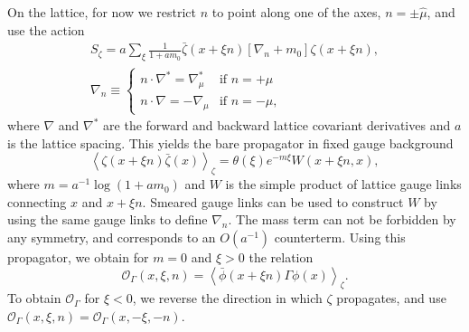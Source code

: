 \documentclass[prl,reprint,notitlepage,nofootinbib]{revtex4-1}
\newcommand{\cO}{\mathcal{O}}
\begin{document}
On the lattice, for now we restrict $n$ to point along one of the
axes, $n=\pm\hat\mu$, and use the action
\begin{equation}
\begin{gathered}
  S_\zeta = a\sum_\xi\frac{1}{1+am_0}\bar\zeta(x+\xi n)\left[\nabla_n+m_0\right]\zeta(x+\xi n),\\
\nabla_n\equiv\begin{cases}
n\cdot\nabla^* = \nabla^*_\mu & \text{if }n=+\hat\mu \\
n\cdot\nabla = -\nabla_\mu & \text{if }n=-\hat\mu,
\end{cases}
\end{gathered}
\end{equation}
where $\nabla$ and $\nabla^*$ are the forward and backward lattice
covariant derivatives and $a$ is the lattice spacing. This yields the
bare propagator in fixed gauge background
\begin{equation}
  \left\langle \zeta(x+\xi n)\bar\zeta(x)\right\rangle_\zeta = \theta(\xi)e^{-m\xi}W(x+\xi n,x),
\end{equation}
where $m=a^{-1}\log(1+am_0)$ and $W$ is the simple product of lattice
gauge links connecting $x$ and $x+\xi n$. Smeared gauge links can be
used to construct $W$ by using the same gauge links to define
$\nabla_n$. The mass term can not be forbidden by any symmetry, and
corresponds to an $O(a^{-1})$ counterterm. Using this propagator, we
obtain for $m=0$ and $\xi>0$ the relation
\begin{equation}
  \cO_\Gamma(x,\xi,n) = \left\langle \bar\phi(x+\xi n)\Gamma \phi(x) \right\rangle_\zeta.
\end{equation}
To obtain $\cO_\Gamma$ for $\xi<0$, we reverse the direction in which
$\zeta$ propagates, and use
$\cO_\Gamma(x,\xi,n)=\cO_\Gamma(x,-\xi,-n)$.
\end{document}
